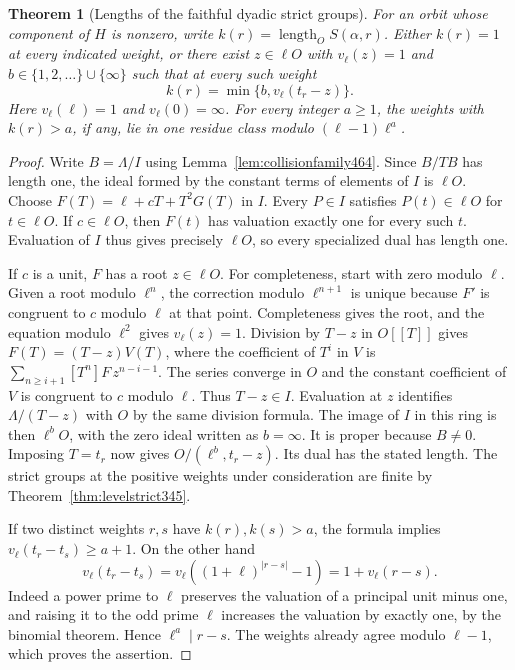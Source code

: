 \documentclass[a4paper,11pt]{article}
\newtheorem{theorem}[proposition]{Theorem}
\theoremstyle{definition}
\theoremstyle{remark}
\numberwithin{equation}{section}
\begin{document}
\begin{theorem}[Lengths of the faithful dyadic strict groups]\leavevmode
\label{thm:collisionbranch464}
For an orbit whose component of \(H\) is nonzero, write
\(k(r)=\operatorname{length}_O S(\alpha,r)\). Either \(k(r)=1\)
at every indicated weight, or there exist \(z\in\ell O\) with
\(v_\ell(z)=1\) and \(b\in\{1,2,\ldots\}\cup\{\infty\}\) such
that at every such weight
\[
                    k(r)=\min\{b,v_\ell(t_r-z)\}.
\]
Here \(v_\ell(\ell)=1\) and \(v_\ell(0)=\infty\). For every
integer \(a\ge1\), the weights with \(k(r)>a\), if any, lie in
one residue class modulo \((\ell-1)\ell^a\).
\end{theorem}
\begin{proof}
Write \(B=\Lambda/I\) using Lemma~\ref{lem:collisionfamily464}.
Since \(B/TB\) has length one, the ideal formed by the constant
terms of elements of \(I\) is \(\ell O\). Choose
\(F(T)=\ell+cT+T^2G(T)\) in \(I\). Every \(P\in I\) satisfies
\(P(t)\in\ell O\) for \(t\in\ell O\). If \(c\in\ell O\), then
\(F(t)\) has valuation exactly one for every such \(t\).
Evaluation of \(I\) thus gives precisely \(\ell O\), so every
specialized dual has length one.

If \(c\) is a unit, \(F\) has a root \(z\in\ell O\). For
completeness, start with zero modulo \(\ell\). Given a root
modulo \(\ell^n\), the correction modulo \(\ell^{n+1}\) is
unique because \(F'\) is congruent to \(c\) modulo \(\ell\)
at that point. Completeness gives the root, and the equation
modulo \(\ell^2\) gives \(v_\ell(z)=1\). Division by \(T-z\)
in \(O[[T]]\) gives \(F(T)=(T-z)V(T)\), where the coefficient
of \(T^i\) in \(V\) is
\(\sum_{n\ge i+1}[T^n]F\,z^{n-i-1}\). The series converge
in \(O\) and the constant coefficient of \(V\) is congruent
to \(c\) modulo \(\ell\). Thus \(T-z\in I\). Evaluation at
\(z\) identifies \(\Lambda/(T-z)\) with \(O\) by the same
division formula. The image of \(I\) in this ring is then
\(\ell^b O\), with the zero ideal written as \(b=\infty\).
It is proper because \(B\ne0\). Imposing \(T=t_r\) now gives
\(O/(\ell^b,t_r-z)\). Its dual has the stated length. The
strict groups at the positive weights under consideration are
finite by Theorem~\ref{thm:levelstrict345}.

If two distinct weights \(r,s\) have \(k(r),k(s)>a\), the formula
implies \(v_\ell(t_r-t_s)\ge a+1\). On the other hand
\[
 v_\ell(t_r-t_s)=v_\ell((1+\ell)^{|r-s|}-1)=1+v_\ell(r-s).
\]
Indeed a power prime to \(\ell\) preserves the valuation of a
principal unit minus one, and raising it to the odd prime
\(\ell\) increases the valuation by exactly one, by the binomial
theorem. Hence \(\ell^a\mid r-s\). The weights already agree
modulo \(\ell-1\), which proves the assertion.
\end{proof}
\end{document}
